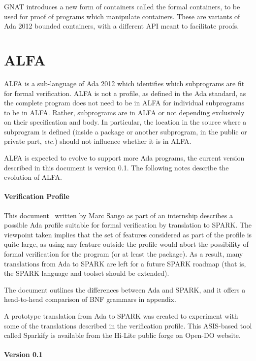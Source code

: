 \documentclass{article}
\newcommand{\version}{0.1}
\newcommand{\etc}{\textit{etc.}\xspace}
\begin{document}
GNAT introduces a new form of containers called the formal containers, to be
used for proof of programs which manipulate containers. These are variants of
Ada 2012 bounded containers, with a different API meant to facilitate proofs.

\section{ALFA}

ALFA is a sub-language of Ada 2012 which identifies which subprograms are fit
for formal verification. ALFA is not a profile, as defined in the Ada standard,
as the complete program does not need to be in ALFA for individual subprograms
to be in ALFA. Rather, subprograms are in ALFA or not depending exclusively on
their specification and body. In particular, the location in the source where a
subprogram is defined (inside a package or another subprogram, in the public or
private part, \etc) should not influence whether it is in ALFA.

ALFA is expected to evolve to support more Ada programs, the current version
described in this document is version \version. The following notes describe
the evolution of ALFA.

\paragraph{Verification Profile} 

This document~\cite{Sango2010RR} written by Marc Sango as part of an internship
describes a possible Ada profile suitable for formal verification by
translation to SPARK. The viewpoint taken implies that the set of features
considered as part of the profile is quite large, as using any feature outside
the profile would abort the possibility of formal verification for the program
(or at least the package). As a result, many translations from Ada to SPARK are
left for a future SPARK roadmap (that is, the SPARK language and toolset should
be extended).

The document outlines the differences between Ada and SPARK, and it
offers a head-to-head comparison of BNF grammars in appendix.

A prototype translation from Ada to SPARK was created to experiment with some
of the translations described in the verification profile. This ASIS-based tool
called Sparkify is available from the Hi-Lite public forge on Open-DO website.

\paragraph{Version \version}
\end{document}
